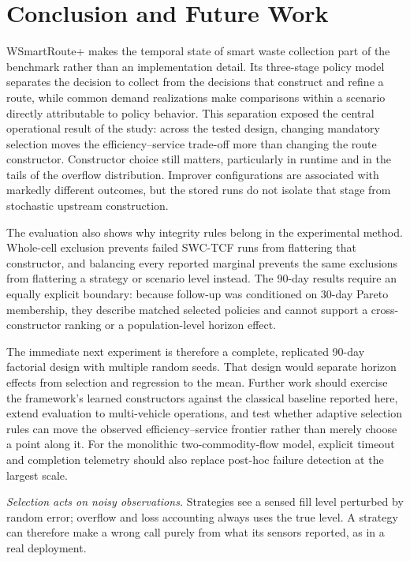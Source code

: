 \documentclass[orivec,runningheads]{llncs}
\begin{document}
\section{Conclusion and Future Work}
WSmartRoute+ makes the temporal state of smart waste collection part of the
benchmark rather than an implementation detail. Its three-stage policy model
separates the decision to collect from the decisions that construct and refine a
route, while common demand realizations make comparisons within a scenario
directly attributable to policy behavior. This separation exposed the central
operational result of the study: across the tested design, changing mandatory
selection moves the efficiency--service trade-off more than changing the route
constructor. Constructor choice still matters, particularly in runtime and in
the tails of the overflow distribution. Improver configurations are associated
with markedly different outcomes, but the stored runs do not isolate that stage
from stochastic upstream construction.

The evaluation also shows why integrity rules belong in the experimental
method. Whole-cell exclusion prevents failed SWC-TCF runs from flattering that
constructor, and balancing every reported marginal prevents the same exclusions
from flattering a strategy or scenario level instead. The 90-day results require
an equally explicit boundary: because follow-up was conditioned on 30-day
Pareto membership, they describe matched selected policies and cannot support a
cross-constructor ranking or a population-level horizon effect.

The immediate next experiment is therefore a complete, replicated 90-day
factorial design with multiple random seeds. That design would separate horizon
effects from selection and regression to the mean. Further work should exercise
the framework's learned constructors against the classical baseline reported
here, extend evaluation to multi-vehicle operations, and test
whether adaptive selection rules can move the observed efficiency--service
frontier rather than merely choose a point along it. For the monolithic
two-commodity-flow model, explicit timeout and completion telemetry should also
replace post-hoc failure detection at the largest scale.

\emph{Selection acts on noisy observations.} Strategies see a sensed fill level perturbed by random error; overflow and loss accounting always uses the true level. A strategy can therefore make a wrong call purely from what its sensors reported, as in a real deployment.
\end{document}
